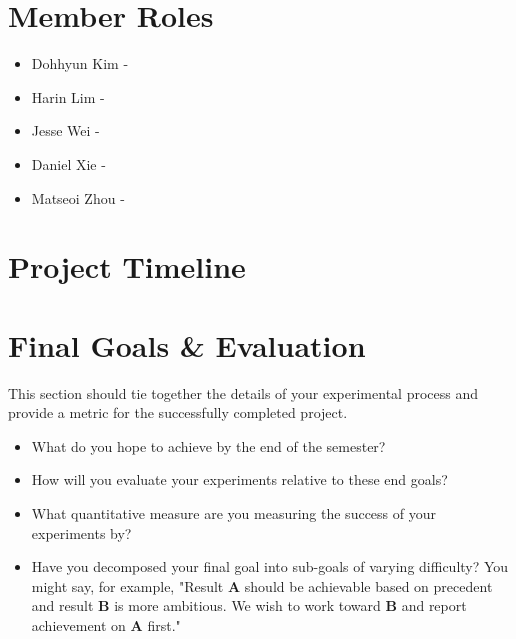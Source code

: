 \documentclass{article} %
\begin{document}
\section{Member Roles}

\begin{itemize}
\item Dohhyun Kim - 
\item Harin Lim - 
\item Jesse Wei - 
\item Daniel Xie - 
\item Matseoi Zhou - 
\end{itemize}


\section{Project Timeline}

\section{Final Goals \& Evaluation}

This section should tie together the details of your experimental process and provide a metric for the successfully completed project.

\begin{itemize}
\item What do you hope to achieve by the end of the semester?
\item How will you evaluate your experiments relative to these end goals?
\item What quantitative measure are you measuring the success of your experiments by?
\item Have you decomposed your final goal into sub-goals of varying difficulty? You might say, for example, "Result \textbf{A} should be achievable based on precedent and result \textbf{B} is more ambitious. We wish to work toward \textbf{B} and report achievement on \textbf{A} first."
\end{itemize}
\end{document}
